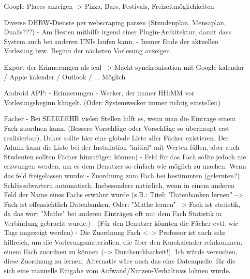Google Places anzeigen -> Pizza, Bars, Festivals, Freizeitmöglichkeiten %

Diverse DHBW-Dienste per webscraping parsen (Stundenplan, Mensaplan, Dualis???) - Am Besten mithilfe irgend einer Plugin-Architektur, damit dass System auch bei anderen UNIs laufen kann.
    - Immer Ende der aktuellen Vorlesung bzw. Beginn der nächsten Vorlesung anzeigen.


Export der Erinnerungen als ical --> Macht synchronisation mit Google kalendar / Apple kalender / Outlook / ... Möglich %

Android APP: %
    - Erinnerungen
    - Wecker, der immer HH:MM vor Vorlesungsbeginn klingelt. (Oder: Systemwecker immer richtig einstellen)

Fächer %
    - Bei SEEEEEHR vielen Stellen hilft es, wenn man die Einträge einem Fach zuordnen kann. (Bessere Vorschläge oder Vorschläge so überhaupt erst realisierbar). Daher sollte hier eine globale Liste aller Fächer existieren. Der Admin kann die Liste bei der Installation "initial" mit Werten füllen, aber auch Studenten sollten Fächer hinzufügen können)
    - Feld für das Fach sollte jedoch nie erzwungen werden, um es dem Benutzer so einfach wie möglich zu machen. Wenn das feld freigelassen wurde: 
    - Zuordnung zum Fach bei bestimmten (gelernten?) Schlüsselwärtern automatisch. Insbesondere natürlich, wenn in einem anderen Feld der Name eines Fachs erwähnt wurde (z.B.: Titel: "Datenbanken lernen" --> Fach ist offensichtlich Datenbanken. Oder: "Mathe lernen" --> Fach ist statistik, da das wort "Mathe" bei anderen Einträgen oft mit dem Fach Statistik in Verbindung gebracht wurde.)
    - (Für den Benutzer könnten die Fächer evtl. wie Tags angezeigt werden)
    - Die Zuordnung Fach <--> Professor ist auch sehr hilfreich, um die Vorlesungsmaterialien, die über den Kurskalender reinkommen, einem Fach zuordnen zu können (--> Durchsuchbarkeit!). Ich würde versuchen, diese Zuordnung zu lernen. Alternativ wäre auch das eine Datenquelle, für die sich eine manuelle Eingabe vom Aufwand/Nutzen-Verhältniss lohnen würde.

